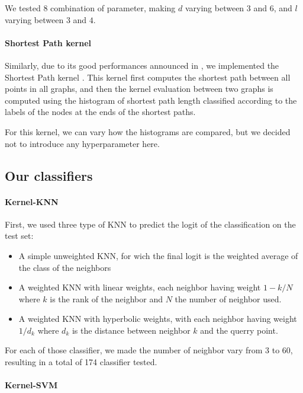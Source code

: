 \documentclass[sigconf, nonacm]{acmart}
\begin{document}
We tested 8 combination of parameter, making $d$ varying between $3$ and $6$, and $l$ varying between $3$ and $4$.

\paragraph{Shortest Path kernel}

Similarly, due to its good performances announced in \cite{nikolentzos_graph_2021}, we implemented the Shortest Path kernel \cite{borgwardt_shortest-path_2005}. This kernel first computes the shortest path between all points in all graphs, and then the kernel evaluation between two graphs is computed using the histogram of shortest path length classified according to the labels of the nodes at the ends of the shortest paths.

For this kernel, we can vary how the histograms are compared, but we decided not to introduce any hyperparameter here.

\subsection{Our classifiers}

\paragraph{Kernel-KNN}

First, we used three type of KNN to predict the logit of the classification on the test set:
\begin{itemize}
    \item A simple unweighted KNN, for wich the final logit is the weighted average of the class of the neighbors
    \item A weighted KNN with linear weights, each neighbor having weight $1-k/N$ where $k$ is the rank of the neighbor and $N$ the number of neighbor used.
    \item A weighted KNN with hyperbolic weights, with each neighbor having weight $1/d_k$ where $d_k$ is the distance between neighbor $k$ and the querry point.
\end{itemize}

For each of those classifier, we made the number of neighbor vary from 3 to 60, resulting in a total of 174 classifier tested.

\paragraph{Kernel-SVM}
\end{document}
